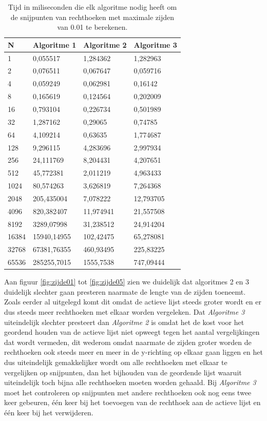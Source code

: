 \documentclass[11pt,a4paper,titlepage]{article}
\begin{document}
		\begin{table}[H]
\centering
\begin{tabular}{ | l | l | l | l |}
\hline
\textbf{N}    &\textbf{Algoritme 1}  & \textbf{Algoritme 2} & \textbf{Algoritme 3} \\ \hline
1     & 0,055517    & 1,284362   & 1,282963  \\ \hline
2     & 0,076511    & 0,067647   & 0,059716 \\ \hline
4     & 0,059249    & 0,062981   & 0,16142   \\ \hline
8     & 0,165619    & 0,124564   & 0,202009    \\ \hline
16    & 0,793104    & 0,226734   & 0,501989    \\ \hline
32    & 1,287162    & 0,29065    & 0,74785     \\ \hline
64    & 4,109214    & 0,63635    & 1,774687     \\ \hline
128   & 9,296115    & 4,283696   & 2,997934     \\ \hline
256   & 24,111769   & 8,204431   & 4,207651    \\ \hline
512   & 45,772381   & 2,011219   & 4,963433   \\ \hline
1024  & 80,574263   & 3,626819   & 7,264368     \\ \hline
2048  & 205,435004  & 7,078222   & 12,793705   \\ \hline
4096  & 820,382407  & 11,974941  & 21,557508    \\ \hline
8192  & 3289,07998  & 31,238512  & 24,914204   \\ \hline
16384 & 15940,14955 & 102,42475  & 65,278081    \\ \hline
32768 & 67381,76355 & 460,93495  & 225,83225    \\ \hline
65536 & 285255,7015 & 1555,7538  & 747,09444 \\ \hline
\end{tabular}
\caption{Tijd in miliseconden die elk algoritme nodig heeft om de snijpunten van rechthoeken met maximale zijden van 0.01 te berekenen.}
\end{table}
Aan figuur \ref{fig:zijde01} tot \ref{fig:zijde05} zien we duidelijk dat algoritmes 2 en 3 duidelijk slechter gaan presteren naarmate de lengte van de zijden toeneemt. Zoals eerder al uitgelegd komt dit omdat de actieve lijst steeds groter wordt en er dus steeds meer rechthoeken met elkaar worden vergeleken. Dat \emph{Algoritme 3} uiteindelijk slechter presteert dan \emph{Algoritme 2} is omdat het de kost voor het geordend houden van de actieve lijst niet opweegt tegen het aantal vergelijkingen dat wordt vermeden, dit wederom omdat naarmate de zijden groter worden de rechthoeken ook steeds meer en meer in de y-richting op elkaar gaan liggen en het dus uiteindelijk gemakkelijker wordt om alle rechthoeken met elkaar te vergelijken op snijpunten, dan het bijhouden van de geordende lijst waaruit uiteindelijk toch bijna alle rechthoeken moeten worden gehaald.  Bij \emph{Algoritme 3} moet het controleren op snijpunten met andere rechthoeken ook nog eens twee keer gebeuren, één keer bij het toevoegen van de rechthoek aan de actieve lijst en één keer bij het verwijderen.
	
\end{document}
